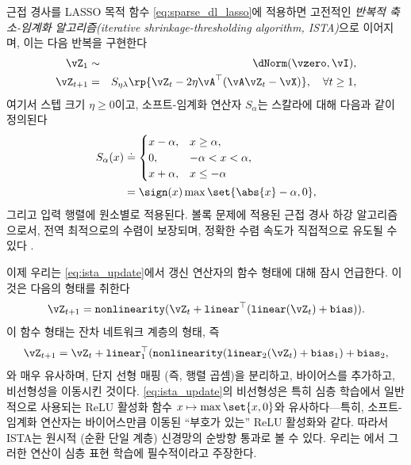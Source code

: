 \documentclass[../../book-main_ko.tex]{subfiles}
\begin{document}
근접 경사를 LASSO 목적 함수 \eqref{eq:sparse_dl_lasso}에 적용하면 고전적인 \textit{반복적 축소-임계화 알고리즘(iterative shrinkage-thresholding algorithm, ISTA)}으로 이어지며, 이는 다음 반복을 구현한다
\begin{eqnarray}
    \vZ_{1} &\sim& \dNorm(\vzero, \vI), \\
    \vZ_{t + 1} &=& S_{\eta\lambda}\rp{\vZ_{t} - 2\eta \vA^{\top}(\vA\vZ_{t} - \vX)}, \quad \forall t \geq 1,\label{eq:ista_update}
\end{eqnarray}
여기서 스텝 크기 \(\eta \geq 0\)이고, 소프트-임계화 연산자 \(S_{\alpha}\)는 스칼라에 대해 다음과 같이 정의된다
\begin{align}
    S_{\alpha}(x) &
    \doteq \begin{cases}x - \alpha, & x \geq \alpha, \\ 0,
    & -\alpha < x < \alpha, \\ x + \alpha, & x \leq -\alpha\end{cases}
    \\
    &=
    \sign(x) \max \set{\abs{x} - \alpha, 0},
\end{align}
그리고 입력 행렬에 원소별로 적용된다. 볼록 문제에 적용된 근접 경사 하강 알고리즘으로서, 전역 최적으로의 수렴이 보장되며, 정확한 수렴 속도가 직접적으로 유도될 수 있다 \cite{Wright-Ma-2022}.

이제 우리는 \eqref{eq:ista_update}에서 갱신 연산자의 함수 형태에 대해 잠시 언급한다. 이것은 다음의 형태를 취한다
\begin{equation}
    \vZ_{t + 1} = \texttt{nonlinearity}(\vZ_{t} + \texttt{linear}^{\top}(\texttt{linear}(\vZ_{t}) + \texttt{bias})).
\end{equation}
이 함수 형태는 잔차 네트워크 계층의 형태, 즉
\begin{equation}
    \vZ_{t + 1} = \vZ_{t} + \texttt{linear}_{1}^{\top}(\texttt{nonlinearity}(\texttt{linear}_{2}(\vZ_{t}) + \texttt{bias}_{1}) + \texttt{bias}_{2},
\end{equation}
와 매우 유사하며, 단지 선형 매핑 (즉, 행렬 곱셈)을 분리하고, 바이어스를 추가하고, 비선형성을 이동시킨 것이다.
\eqref{eq:ista_update}의 비선형성은 특히 심층 학습에서 일반적으로 사용되는 ReLU 활성화 함수 \(x \mapsto \max\set{x, 0}\)와 유사하다---특히, 소프트-임계화 연산자는 바이어스만큼 이동된 ``부호가 있는'' ReLU 활성화와 같다.
따라서 ISTA는 원시적 (순환 단일 계층) 신경망의 순방향 통과로 볼 수 있다. 우리는 에서 그러한 연산이 심층 표현 학습에 필수적이라고 주장한다.
\end{document}
